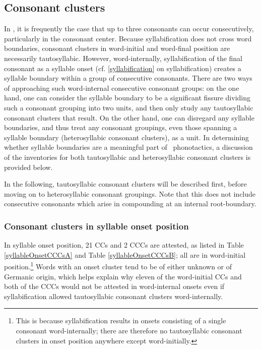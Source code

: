 \subsection{Consonant clusters}\label{CClusters}
In \PS, it is frequently the case that up to three consonants can occur consecutively, particularly in the consonant center. Because syllabification does not cross word boundaries, consonant clusters in word-initial and word-final position are necessarily tautosyllabic. However, word-internally, syllabification of the final consonant as a syllable onset (cf. \SEC\ref{syllabification} on syllabification) creates a syllable boundary within a group of consecutive consonants. There are two ways of approaching such word-internal consecutive consonant groups: on the one hand, one can consider the syllable boundary to be a significant fissure dividing such a consonant grouping into two units, and then only study any tautosyllabic consonant clusters that result. On the other hand, one can disregard any syllable boundaries, and thus treat any consonant groupings, even those spanning a syllable boundary (heterosyllabic consonant clusters), as a unit. 
In determining whether syllable boundaries are a meaningful part of \PS\ phonotactics, a discussion of the inventories for both tautosyllabic and heterosyllabic consonant clusters is provided below. 

In the following, tautosyllabic consonant clusters will be described first, before moving on to heterosyllabic consonant groupings. Note that this does not include consecutive consonants which arise in compounding at an internal root-boundary.


\subsubsection[CCs in onset position]{Consonant clusters in syllable onset position}
In syllable onset position, 21 CCs and 2 CCCs are attested, as listed in Table \ref{syllableOnsetCCCsA} and Table \vref{syllableOnsetCCCsB}; %
all are in word-initial position.\footnote{This is because syllabification results in onsets consisting of a single consonant word-internally; there are therefore no tautosyllabic consonant clusters in onset position anywhere except word-initially.} 
Words with an onset cluster tend to be of either unknown or of Germanic origin, %
which helps explain why eleven of the word-initial CCs and both of the CCCs would not be attested in word-internal onsets even if syllabification allowed tautosyllabic consonant clusters word-internally. %


